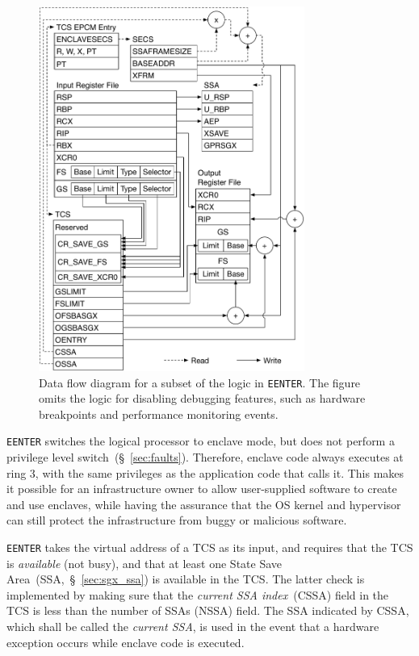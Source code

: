 \begin{figure}[hbt]
  \centering
  \includegraphics[width=87mm]{figures/sgx_eenter.pdf}
  \caption{
    Data flow diagram for a subset of the logic in \texttt{EENTER}. The figure
    omits the logic for disabling debugging features, such as hardware
    breakpoints and performance monitoring events.
  }
  \label{fig:sgx_eenter}
\end{figure}

\texttt{EENTER} switches the logical processor to enclave mode, but does not
perform a privilege level switch~(\S~\ref{sec:faults}). Therefore, enclave code
always executes at ring 3, with the same privileges as the application code
that calls it. This makes it possible for an infrastructure owner to allow
user-supplied software to create and use enclaves, while having the assurance
that the OS kernel and hypervisor can still protect the infrastructure from
buggy or malicious software.


\texttt{EENTER} takes the virtual address of a TCS as its input, and requires
that the TCS is \textit{available} (not busy), and that at least one State Save
Area~(SSA,~\S~\ref{sec:sgx_ssa}) is available in the TCS. The latter check is
implemented by making sure that the \textit{current SSA index}~(CSSA) field in
the TCS is less than the number of SSAs (NSSA) field. The SSA indicated by
CSSA, which shall be called the \textit{current SSA}, is used in the event that
a hardware exception occurs while enclave code is executed.

